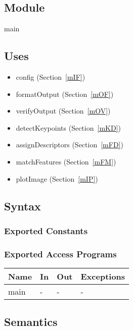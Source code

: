 \documentclass[12pt, titlepage]{article}
\begin{document}
\subsection{Module}
main

\subsection{Uses}
\begin{itemize}
  \item config (Section~\ref{mIF})
  \item formatOutput (Section~\ref{mOF})
  \item verifyOutput (Section~\ref{mOV})
  \item detectKeypoints (Section~\ref{mKD})
  \item assignDescriptors (Section~\ref{mFD})
  \item matchFeatures (Section~\ref{mFM})
  \item plotImage (Section~\ref{mIP})

\end{itemize}

\subsection{Syntax}

\subsubsection{Exported Constants}

\subsubsection{Exported Access Programs}

\begin{center}
\begin{tabular}{p{2cm} p{4cm} p{4cm} p{2cm}}
\hline
\textbf{Name} & \textbf{In} & \textbf{Out} & \textbf{Exceptions} \\
\hline
main & - & - & - \\
\hline
\end{tabular}
\end{center}

\subsection{Semantics}
\end{document}
